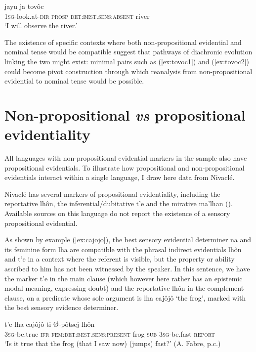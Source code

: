 \documentclass[oneside,a4paper,11pt]{article}
\newcommand{\ipa}[1]{{\phon \mbox{#1}}} %
\begin{document}
\begin{exe}
\ex \label{ex:tovoc4}
\gll \ipa{j-ovalh-ei}  \ipa{jayu}   \ipa{ja} \ipa{tovôc} \\
 \textsc{1sg}-look.at-\textsc{dir} \textsc{prosp} \textsc{det:best.sens:absent} river \\
\glt `I will observe the river.'
\end{exe}

The existence of specific contexts where both non-propositional evidential and nominal tense would be compatible suggest that  pathways of diachronic evolution linking the two might exist: minimal pairs such as (\ref{ex:tovoc1}) and (\ref{ex:tovoc2}) could become pivot construction through which reanalysis from non-propositional evidential to nominal tense would be possible.

\section{Non-propositional \textit{vs} propositional evidentiality} \label{sec:prop}
 All languages with non-propositional evidential markers in the sample also have propositional evidentials. To illustrate how propositional and non-propositional evidentials interact within a single language, I draw here data from Nivaclé.
 
 Nivaclé has several markers of propositional evidentiality, including the reportative \ipa{lhôn}, the inferential/dubitative \ipa{t'e}  and the mirative \ipa{ma'lhan} (\citealt[256-257]{fabre14nivacle}). Available sources on this language do not report the existence of a sensory propositional evidential.

As shown by example (\ref{ex:cajojo}), the best sensory evidential determiner \ipa{na} and its feminine form \ipa{lha} are compatible with the phrasal indirect evidentials \ipa{lhôn} and \ipa{t'e} in a context where the referent is visible, but the property or ability ascribed to him has not been witnessed by the speaker. In this sentence, we have the marker \ipa{t'e} in the main clause (which however here rather has an epistemic modal meaning, expressing doubt) and the reportative \ipa{lhôn} in the complement clause, on a predicate whose sole argument is \ipa{lha} \ipa{cajôjô} `the frog', marked with the best sensory evidence determiner.

\begin{exe}
\ex \label{ex:cajojo}
\gll \ipa{y-ijô’} \ipa{t’e} \ipa{lha} \ipa{cajôjô} \ipa{ti} \ipa{Ø-pôtsej} \ipa{lhôn} \\
\textsc{3sg}-be.true \textsc{ifr} \textsc{fem:det:best.sens:present} frog \textsc{sub} \textsc{3sg}-be.fast \textsc{report} \\
\glt `Is it true that the frog (that I saw now) (jumps) fast?' (A. Fabre, p.c.)
\end{exe}
\end{document}
